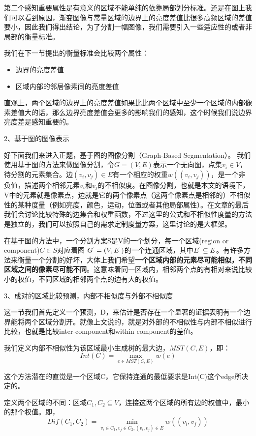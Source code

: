第二个感知重要属性是有意义的区域不能单纯的依靠局部划分标准。还是在图上我们可以看到原因，渐变图像与常量区域的边界上的亮度差值比很多高频区域的差值要小，因此我们得出结论，为了分割一幅图像，我们需要引入一些适应性的或者非局部的衡量标准。

我们在下一节提出的衡量标准会比较两个属性：
\begin{itemize}
\item 边界的亮度差值
\item 区域内部的邻居像素间的亮度差值
\end{itemize}
直观上，两个区域的边界上的亮度差值如果比比两个区域中至少一个区域的内部像素差值大的话，那么边界亮度差值会更多的影响我们的感知，这个时候我们说边界亮度差是感知重要的。

2、基于图的图像表示

好下面我们来进入正题，基于图的图像分割（Graph-Based Segmentation）。
我们使用基于图的方法来做图像分割，令\(G=(V,E)\)表示一个无向图，点集\(v_i \in V\)，待分割的元素集合。边\((v_i,v_j) \in E\)有一个相应的权重\(w((v_i,v_j))\)，是一个非负值，描述两个相邻元素\(v_i\)和\(v_j\)的不相似度。在图像分割，也就是本文的语境下，V中的元素就是像素点，边就是它的两个像素点（这两个像素点是相邻的）不相似性的某种度量（例如亮度，颜色，运动，位置或者其他局部属性）。在文章的最后我们会讨论比较特殊的边集合和权重函数，不过这里的公式和不相似性度量的方法是独立的，我们可以按照自己的需求定制度量方案，这里讨论的是大框架。

在基于图的方法中，一个分割方案S是V的一个划分，每一个区域(region or component)\(C \in S\)对应着图
\(G^` = (V,E^`)\)的一个连通区域，其中\(E^` \subseteq E\)。有许多方法来衡量一个分割的好坏，大体上我们希望\textbf{一个区域内部的元素尽可能相似，不同区域之间的像素尽可能不同}。这意味着同一区域内，相邻两个点的有相对来说比较小的权值，不同区域的相邻两个点的边有大的权值。

3、成对的区域比较预测，内部不相似度与外部不相似度

这一节我们首先定义一个预测，D，来估计是否存在一个显著的证据表明有一个边界能将两个区域分割开。就像上文说的，就是对外部的不相似性与内部不相似进行比较，也就是比较inter-component和within component的差值。

我们定义内部不相似性为该区域最小生成树的最大边，\(MST(C,E)\)，即：
\begin{equation}
Int(C) = \mathop {\max }\limits_{e \in MST(C,E)}w(e)
\end{equation}

这个方法潜在的直觉是一个区域C，它保持连通的最低要求是Int(C)这个edge所决定的。

定义两个区域的不同：区域\(C_1,C_2 \subseteq V\)，连接这两个区域的所有边的权值中，最小的那个权值。即，
\begin{equation}
Dif(C_1,C_2) = \mathop {\min }\limits_{v_i \in C_1 ,v_j \in C_2, (v_i,v_j) \in E}w((v_i,v_j))
\end{equation}

